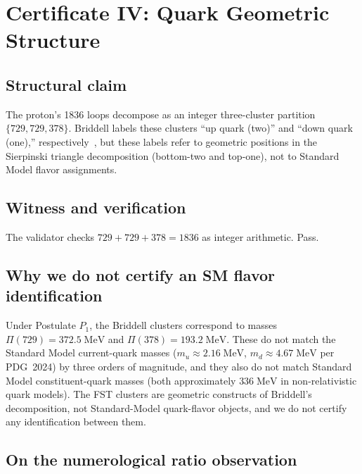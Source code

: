 \documentclass[12pt,a4paper]{article}
\begin{document}

\section{Certificate IV: Quark Geometric Structure}
\label{sec:cert4}

\subsection{Structural claim}

The proton's 1836 loops decompose as an integer three-cluster
partition $\{729, 729, 378\}$. Briddell labels these clusters
``up quark (two)'' and ``down quark (one),''
respectively~\cite[lines 1287--1288]{briddellbook2020}, but these
labels refer to geometric positions in the Sierpinski triangle
decomposition (bottom-two and top-one), not to Standard Model
flavor assignments.

\subsection{Witness and verification}

The validator checks $729 + 729 + 378 = 1836$ as integer arithmetic.
Pass.

\subsection{Why we do not certify an SM flavor identification}
\label{sec:no-sm-flavor}

Under Postulate $P_1$, the Briddell clusters correspond to masses
$\Pi(729) = 372.5\;\mathrm{MeV}$ and $\Pi(378) = 193.2\;\mathrm{MeV}$.
These do not match the Standard Model current-quark masses
($m_u \approx 2.16\;\mathrm{MeV}$, $m_d \approx 4.67\;\mathrm{MeV}$
per PDG~2024) by three orders of magnitude, and they also do not
match Standard Model constituent-quark masses (both approximately
$336\;\mathrm{MeV}$ in non-relativistic quark models). The FST
clusters are geometric constructs of Briddell's decomposition, not
Standard-Model quark-flavor objects, and we do not certify any
identification between them.

\subsection{On the numerological ratio observation}
\end{document}
